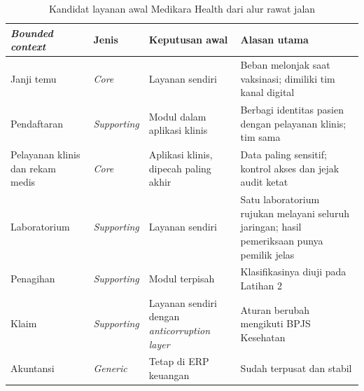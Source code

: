 \begin{table}[!htb]
  \centering
  \caption{Kandidat layanan awal Medikara Health dari alur rawat jalan}
  \label{tab:ch06-kandidat-layanan}
  \footnotesize
  \begin{tabularx}{\textwidth}{>{\raggedright\arraybackslash}p{2.4cm} >{\raggedright\arraybackslash}p{1.8cm} >{\raggedright\arraybackslash}p{3.0cm} >{\raggedright\arraybackslash}X}
    \hline
    \textbf{\textit{Bounded context}} & \textbf{Jenis} & \textbf{Keputusan awal} &
      \textbf{Alasan utama} \\ \hline
    Janji temu & \textit{Core} & Layanan sendiri & Beban melonjak saat vaksinasi; dimiliki tim kanal
      digital \\ \hline
    Pendaftaran & \textit{Supporting} & Modul dalam aplikasi klinis & Berbagi identitas pasien
      dengan pelayanan klinis; tim sama \\ \hline
    Pelayanan klinis dan rekam medis & \textit{Core} & Aplikasi klinis, dipecah paling akhir &
      Data paling sensitif; kontrol akses dan jejak audit ketat \\ \hline
    Laboratorium & \textit{Supporting} & Layanan sendiri & Satu laboratorium rujukan melayani
      seluruh jaringan; hasil pemeriksaan punya pemilik jelas \\ \hline
    Penagihan & \textit{Supporting} & Modul terpisah & Klasifikasinya diuji pada Latihan 2 \\
      \hline
    Klaim & \textit{Supporting} & Layanan sendiri dengan \textit{anticorruption layer} & Aturan
      berubah mengikuti BPJS Kesehatan \\ \hline
    Akuntansi & \textit{Generic} & Tetap di ERP keuangan & Sudah terpusat dan stabil \\ \hline
  \end{tabularx}
\end{table}

